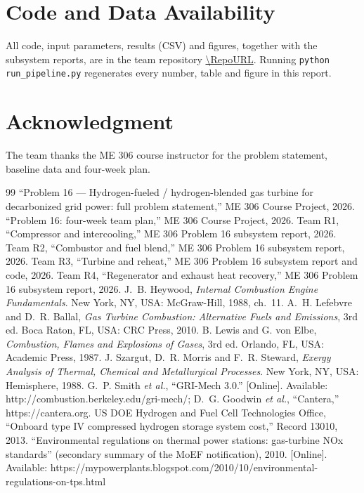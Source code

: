 \documentclass[10pt,a4paper,twocolumn]{article}
\begin{document}
\section*{Code and Data Availability}
All code, input parameters, results (CSV) and figures, together with the subsystem reports, are in the team repository \url{\RepoURL}. Running \texttt{python run\_pipeline.py} regenerates every number, table and figure in this report.

\section*{Acknowledgment}
The team thanks the ME 306 course instructor for the problem statement, baseline data and four-week plan.

\footnotesize
\begin{thebibliography}{99}
 ``Problem 16 --- Hydrogen-fueled / hydrogen-blended gas turbine for decarbonized grid power: full problem statement,'' ME 306 Course Project, 2026.
 ``Problem 16: four-week team plan,'' ME 306 Course Project, 2026.
 Team R1, ``Compressor and intercooling,'' ME 306 Problem 16 subsystem report, 2026.
 Team R2, ``Combustor and fuel blend,'' ME 306 Problem 16 subsystem report, 2026.
 Team R3, ``Turbine and reheat,'' ME 306 Problem 16 subsystem report and code, 2026.
 Team R4, ``Regenerator and exhaust heat recovery,'' ME 306 Problem 16 subsystem report, 2026.
 J.~B. Heywood, \emph{Internal Combustion Engine Fundamentals}. New York, NY, USA: McGraw-Hill, 1988, ch.~11.
 A.~H. Lefebvre and D.~R. Ballal, \emph{Gas Turbine Combustion: Alternative Fuels and Emissions}, 3rd ed. Boca Raton, FL, USA: CRC Press, 2010.
 B. Lewis and G. von Elbe, \emph{Combustion, Flames and Explosions of Gases}, 3rd ed. Orlando, FL, USA: Academic Press, 1987.
 J. Szargut, D.~R. Morris and F.~R. Steward, \emph{Exergy Analysis of Thermal, Chemical and Metallurgical Processes}. New York, NY, USA: Hemisphere, 1988.
 G.~P. Smith \emph{et al.}, ``GRI-Mech 3.0.'' [Online]. Available: http://combustion.berkeley.edu/gri-mech/; D.~G. Goodwin \emph{et al.}, ``Cantera,'' https://cantera.org.
 US DOE Hydrogen and Fuel Cell Technologies Office, ``Onboard type IV compressed hydrogen storage system cost,'' Record 13010, 2013.
 ``Environmental regulations on thermal power stations: gas-turbine NOx standards'' (secondary summary of the MoEF notification), 2010. [Online]. Available: https://mypowerplants.blogspot.com/2010/10/environmental-regulations-on-tps.html

\end{thebibliography}
\end{document}
